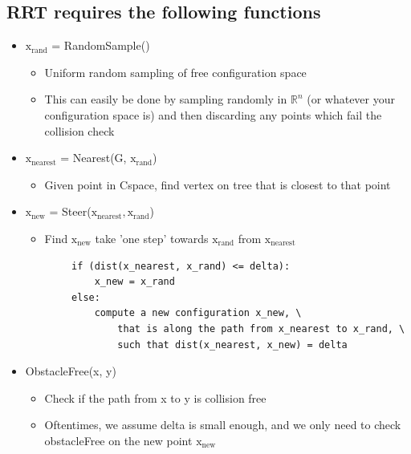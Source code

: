 \documentclass[10pt]{article}
\begin{document}
\subsection*{RRT requires the following functions}
\begin{itemize}
	\item $\text{x}_{\text{rand}}$ = RandomSample()
	\begin{itemize}
        \item Uniform random sampling of free configuration space
        \item This can easily be done by sampling randomly in $\mathbb{R}^n$ (or whatever your configuration space is) and then discarding any points which fail the collision check
    \end{itemize}
    \item $\text{x}_{\text{nearest}}$ = Nearest(G, $\text{x}_{\text{rand}}$)
    \begin{itemize}
        \item Given point in Cspace, find vertex on tree that is closest to that point
    \end{itemize}
    \item $\text{x}_{\text{new}}$ = Steer($\text{x}_{\text{nearest}}, \text{x}_{\text{rand}}$)
    \begin{itemize}
        \item Find $\text{x}_{\text{new}}$ take 'one step' towards $\text{x}_{\text{rand}}$ from $\text{x}_{\text{nearest}}$
    \end{itemize}
    \begin{verbatim}
        if (dist(x_nearest, x_rand) <= delta):
            x_new = x_rand
        else:
            compute a new configuration x_new, \
                that is along the path from x_nearest to x_rand, \
                such that dist(x_nearest, x_new) = delta
    \end{verbatim}
    \item ObstacleFree(x, y)
    \begin{itemize}
        \item Check if the path from x to y is collision free
        \item Oftentimes, we assume delta is small enough, and we only need to check obstacleFree on the new point $\text{x}_{\text{new}}$
    \end{itemize}
\end{itemize}

\pagebreak
\end{document}
